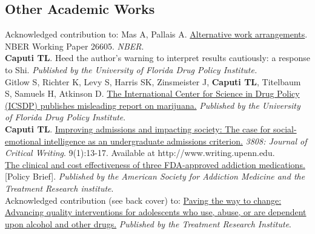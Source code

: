 \documentclass[11pt, letterpaper]{article}
\newcommand{\years}[1]{\marginnote{\normalsize #1}}
\begin{document}
\subsection*{Other Academic Works}
\noindent
\years{2020}Acknowledged contribution to: Mas A, Pallais A. \href{https://www.nber.org/papers/w26605.pdf}{Alternative work arrangements}. NBER Working Paper 26605. \emph{NBER}.\\[.2cm]
\years{2017}\textbf{Caputi TL}. Heed the author’s warning to interpret results cautiously: a response to Shi. \emph{Published by the University of Florida Drug Policy Institute.}\\[.2cm]
\years{2015}Gitlow S, Richter K, Levy S, Harris SK, Zinsmeister J, \textbf{Caputi TL}, Titelbaum S, Samuels H, Atkinson D.  \href{https://www.academia.edu/16576576/The_International_Centre_for_Science_in_Drug_Policy_ICSDP_Publishes_Misleading_Report_on_Marijuana}{The International Center for Science in Drug Policy (ICSDP) publishes misleading report on marijuana.} \textit{Published by the University of Florida Drug Policy Institute}.\\ [.2cm]
\years{2015}\textbf{Caputi TL}. \href{http://www.writing.upenn.edu/critical/opportunities/3808/pdf/3808_fall_2015.pdf#page=13}{Improving admissions and impacting society: The case for social-emotional intelligence as an undergraduate admissions criterion.} \textit{3808: Journal of Critical Writing}. 9(1):13-17. Available at
http://www.writing.upenn.edu.\\[.2cm]
\years{2014}\href{https://web.archive.org/web/20170622171723/https://www.asam.org/docs/default-source/2015-conference-epk/asam-impact_cce-4-02-14.pdf?sfvrsn=4}{The clinical and cost effectiveness of three FDA-approved addiction medications.} [Policy Brief]. \textit{Published by the American Society for Addiction Medicine and the Treatment Research institute}. \\[.2cm]
\years{2014}Acknowledged contribution (see back cover) to: \href{https://issuu.com/tri_solutions/docs/tri_report_singlepages_highres}{Paving the way to change: Advancing quality interventions for adolescents who use, abuse, or are dependent upon alcohol and other drugs.} \textit{Published by the Treatment Research Institute}. \\[.2cm]
\end{document}
